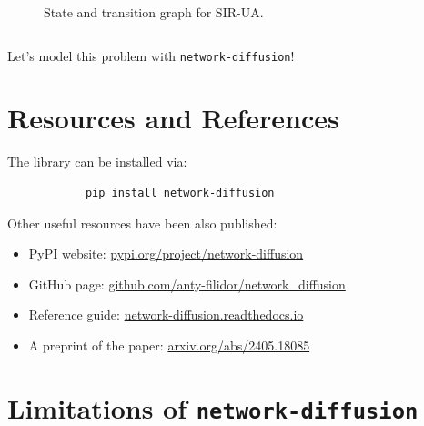\documentclass{beamer}
\begin{document}
\begin{frame}{\secname}
\begin{columns}[T]
\begin{column}{0.5\textwidth}
\begin{figure}
            \caption{State and transition graph for SIR-UA.}
        \end{figure}
        \end{column}
      \end{columns}
\end{frame}

\begin{frame}{\secname}
    \begin{center}
        \large Let's model this problem with \lstinline[style=py]{network-diffusion}!
    \end{center}
\end{frame}

\section{Resources and References}

\begin{frame}[fragile]{\secname}
    The library can be installed via:
    \begin{center}
        \large
        \begin{verbatim}
            pip install network-diffusion
        \end{verbatim}
    \end{center}
    Other useful resources have been also published:
    \begin{itemize}
        \item PyPI website: \url{pypi.org/project/network-diffusion}
        \item GitHub page: \url{github.com/anty-filidor/network_diffusion}
        \item Reference guide: \url{network-diffusion.readthedocs.io}
        \item A preprint of the paper: \url{arxiv.org/abs/2405.18085}
    \end{itemize}
\end{frame}

\section{Limitations of \lstinline[style=py]{network-diffusion}}
\end{document}
